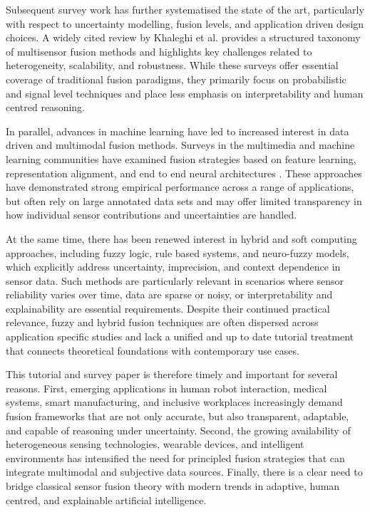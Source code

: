 \documentclass[journal]{IEEEtran}
\begin{document}
Subsequent survey work has further systematised the state of the art, particularly with respect to uncertainty modelling, fusion levels, and application driven design choices. A widely cited review by Khaleghi et al. \cite{khaleghi_multisensor_2013} provides a structured taxonomy of multisensor fusion methods and highlights key challenges related to heterogeneity, scalability, and robustness. While these surveys offer essential coverage of traditional fusion paradigms, they primarily focus on probabilistic and signal level techniques and place less emphasis on interpretability and human centred reasoning.

In parallel, advances in machine learning have led to increased interest in data driven and multimodal fusion methods. Surveys in the multimedia and machine learning communities have examined fusion strategies based on feature learning, representation alignment, and end to end neural architectures \cite{atrey_multimodal_2010, baltrusaitis_multimodal_2019}. These approaches have demonstrated strong empirical performance across a range of applications, but often rely on large annotated data sets and may offer limited transparency in how individual sensor contributions and uncertainties are handled.

At the same time, there has been renewed interest in hybrid and soft computing approaches, including fuzzy logic, rule based systems, and neuro-fuzzy models, which explicitly address uncertainty, imprecision, and context dependence in sensor data. Such methods are particularly relevant in scenarios where sensor reliability varies over time, data are sparse or noisy, or interpretability and explainability are essential requirements. Despite their continued practical relevance, fuzzy and hybrid fusion techniques are often dispersed across application specific studies and lack a unified and up to date tutorial treatment that connects theoretical foundations with contemporary use cases.

This tutorial and survey paper is therefore timely and important for several reasons. First, emerging applications in human robot interaction, medical systems, smart manufacturing, and inclusive workplaces increasingly demand fusion frameworks that are not only accurate, but also transparent, adaptable, and capable of reasoning under uncertainty. Second, the growing availability of heterogeneous sensing technologies, wearable devices, and intelligent environments has intensified the need for principled fusion strategies that can integrate multimodal and subjective data sources. Finally, there is a clear need to bridge classical sensor fusion theory with modern trends in adaptive, human centred, and explainable artificial intelligence.
\end{document}

